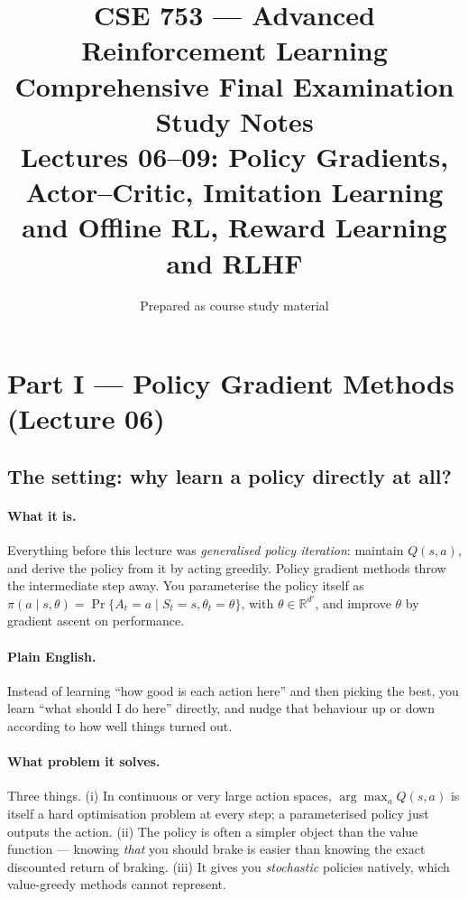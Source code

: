 \documentclass[11pt,a4paper]{article}
\title{CSE 753 --- Advanced Reinforcement Learning\\[4pt]
\large Comprehensive Final Examination Study Notes\\[2pt]
\normalsize Lectures 06--09: Policy Gradients, Actor--Critic, Imitation Learning
and Offline RL, Reward Learning and RLHF}
\author{Prepared as course study material}
\date{}
\begin{document}
\maketitle
\sloppy

\tableofcontents
\newpage

\section{Part I --- Policy Gradient Methods (Lecture 06)}

\subsection{The setting: why learn a policy directly at all?}

\paragraph{What it is.} Everything before this lecture was
\emph{generalised policy iteration}: maintain $Q(s,a)$, and derive the policy
from it by acting greedily. Policy gradient methods throw the intermediate
step away. You parameterise the policy itself as
$\pi(a\mid s,\theta)=\Pr\{A_t=a\mid S_t=s,\theta_t=\theta\}$, with
$\theta\in\mathbb R^{d'}$, and improve $\theta$ by gradient ascent on
performance.

\paragraph{Plain English.} Instead of learning ``how good is each action here''
and then picking the best, you learn ``what should I do here'' directly, and
nudge that behaviour up or down according to how well things turned out.

\paragraph{What problem it solves.} Three things. (i) In continuous or very
large action spaces, $\arg\max_a Q(s,a)$ is itself a hard optimisation
problem at every step; a parameterised policy just outputs the action.
(ii) The policy is often a simpler object than the value function --- knowing
\emph{that} you should brake is easier than knowing the exact discounted
return of braking. (iii) It gives you \emph{stochastic} policies natively,
which value-greedy methods cannot represent.
\end{document}
